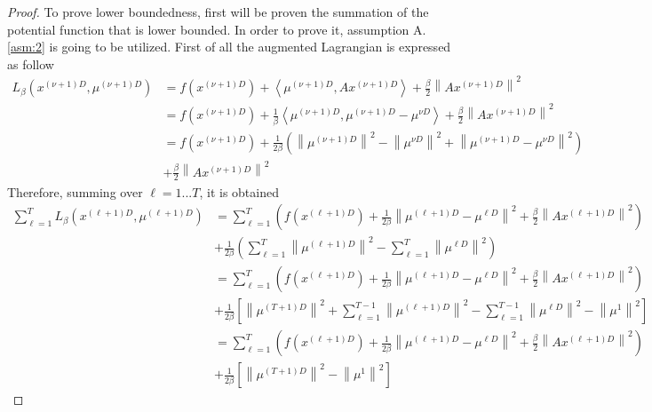     \begin{proof}
        To prove lower boundedness, first will be proven the summation of the potential function that is lower bounded. In order to prove it, assumption A.\ref{asm:2} is going to be utilized. First of all the augmented Lagrangian is expressed as follow
        \begin{equation*}
            \begin{align}
                L_{\beta} (x^{(\nu + 1)D},\mu^{(\nu + 1)D}) &= f(x^{(\nu + 1)D}) + \left \langle \mu^{(\nu + 1)D},Ax^{(\nu + 1)D}\right \rangle + \frac{\beta}{2} \left \lVert Ax^{(\nu + 1)D} \right \rVert^2\\
                & = f(x^{(\nu + 1)D}) + \frac{1}{\beta}\left \langle \mu^{(\nu + 1)D},\mu^{(\nu + 1)D} - \mu^{\nu D}\right \rangle + \frac{\beta}{2} \left \lVert Ax^{(\nu + 1)D} \right \rVert^2\\
                & = f(x^{(\nu + 1)D}) + \frac{1}{2\beta}\left ( \left \lVert \mu^{(\nu + 1)D} \right \rVert^2 - \left \lVert \mu^{\nu D}  \right \rVert^2 + \left \lVert \mu^{(\nu + 1)D} - \mu^{\nu D} \right \rVert^2\right) \\&+ \frac{\beta}{2} \left \lVert Ax^{(\nu + 1)D} \right \rVert^2
            \end{align}
        \end{equation*}
        Therefore, summing over $\ell = 1 ... T$, it is obtained
        \begin{equation*}
            \begin{align}
                \sum_{\ell = 1}^{T}  L_{\beta} (x^{(\ell + 1)D},\mu^{(\ell + 1)D})  &= \sum_{\ell = 1}^{T} \left( f(x^{(\ell + 1)D}) + \frac{1}{2\beta}\left \lVert \mu^{(\ell + 1)D} - \mu^{\ell D} \right \rVert^2 + \frac{\beta}{2} \left \lVert Ax^{(\ell + 1)D} \right \rVert^2\right) \\
                &+\frac{1}{2\beta}\left ( \sum_{\ell = 1}^{T}\left \lVert \mu^{(\ell + 1)D} \right \rVert^2 - \sum_{\ell = 1}^{T}\left \lVert \mu^{\ell D}  \right \rVert^2\right)\\ 
                &= \sum_{\ell = 1}^{T} \left( f(x^{(\ell + 1)D}) + \frac{1}{2\beta}\left \lVert \mu^{(\ell + 1)D} - \mu^{\ell D} \right \rVert^2 + \frac{\beta}{2} \left \lVert Ax^{(\ell + 1)D} \right \rVert^2\right) \\
                &+ \frac{1}{2\beta}\left[ \left\lVert \mu^{(T+1)D}\right\rVert^2 + \sum_{\ell = 1}^{T-1}\left\lVert \mu^{(\ell+1)D}\right\rVert^2 - \sum_{\ell = 1}^{T-1}\left\lVert \mu^{\ell D}\right\rVert^2 - \left\lVert \mu^{1}\right\rVert^2\right]\\
                &= \sum_{\ell = 1}^{T} \left( f(x^{(\ell + 1)D}) + \frac{1}{2\beta}\left \lVert \mu^{(\ell + 1)D} - \mu^{\ell D} \right \rVert^2 + \frac{\beta}{2} \left \lVert Ax^{(\ell + 1)D} \right \rVert^2\right) \\
                &+ \frac{1}{2\beta}\left[ \left\lVert \mu^{(T+1)D}\right\rVert^2  - \left\lVert \mu^{1}\right\rVert^2\right]
            \end{align}
        \end{equation*}
       

\end{proof}
